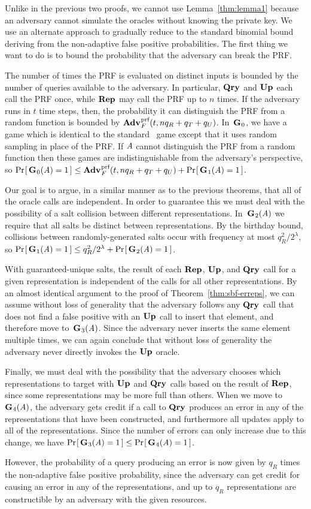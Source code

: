 Unlike in the previous two proofs, we cannot use Lemma~\ref{thm:lemma1} because an adversary cannot simulate the oracles without knowing the private key. We use an alternate approach to gradually reduce to the standard binomial bound deriving from the non-adaptive false positive probabilities. The first thing we want to do is to bound the probability that the adversary can break the PRF.

The number of times the PRF is evaluated on distinct inputs is bounded by the number of queries available to the adversary. In particular, $\textup{\textbf{Qry}}\hspace{0.5pt}$ and $\textup{\textbf{Up}}\hspace{0.5pt}$ each call the PRF once, while $\textup{\textbf{Rep}}\hspace{0.5pt}$ may call the PRF up to $n$ times. If the adversary runs in $t$ time steps, then, the probability it can distinguish the PRF from a random function is bounded by $\Adv{\prf}_F(t,nq_R+q_T+q_U)$. In~$\textup{\textbf{G}}\hspace{0.5pt}_0$, we have a game which is identical to the standard \errep\ game except that it uses random sampling in place of the PRF. If $\mathit{A}$ cannot distinguish the PRF from a random function then these games are indistinguishable from the adversary's perspective, so $\Prob{\game_0(\advA) = 1} \le \Adv{\prf}_F(t,nq_R+q_T+q_U) + \Prob{\game_1(\advA) = 1}$.

Our goal is to argue, in a similar manner as to the previous theorems, that all of the oracle calls are independent. In order to guarantee this we must deal with the possibility of a salt collision between different representations. In~$\textup{\textbf{G}}\hspace{0.5pt}_2(\mathit{A})$ we require that all salts be distinct between representations. By the birthday bound, collisions between randomly-generated salts occur with frequency at most $q_R^2/2^\lambda$, so $\Pr\hspace{-1pt}\left[\,\textup{\textbf{G}}\hspace{0.5pt}_1(\mathit{A}) = 1\,\right] \le q_R^2/2^\lambda + \Pr\hspace{-1pt}\left[\,\textup{\textbf{G}}\hspace{0.5pt}_2(\mathit{A}) = 1\,\right]$.

With guaranteed-unique salts, the result of each $\textup{\textbf{Rep}}\hspace{0.5pt}$, $\textup{\textbf{Up}}\hspace{0.5pt}$, and $\textup{\textbf{Qry}}\hspace{0.5pt}$ call for a given representation is independent of the calls for all other representations. By an almost identical argument to the proof of Theorem~\ref{thm:sbf-erreps}, we can assume without loss of generality that the adversary follows any $\textup{\textbf{Qry}}\hspace{0.5pt}$ call that does not find a false positive with an $\textup{\textbf{Up}}\hspace{0.5pt}$ call to insert that element, and therefore move to~$\textup{\textbf{G}}\hspace{0.5pt}_3(\mathit{A})$. Since the adversary never inserts the same element multiple times, we can again conclude that without loss of generality the adversary never directly invokes the $\textup{\textbf{Up}}\hspace{0.5pt}$ oracle.

Finally, we must deal with the possibility that the adversary chooses which representations to target with $\textup{\textbf{Up}}\hspace{0.5pt}$ and $\textup{\textbf{Qry}}\hspace{0.5pt}$ calls based on the result of $\textup{\textbf{Rep}}\hspace{0.5pt}$, since some representations may be more full than others. When we move to~$\textup{\textbf{G}}\hspace{0.5pt}_4(\mathit{A})$, the adversary gets credit if a call to $\textup{\textbf{Qry}}\hspace{0.5pt}$ produces an error in any of the representations that have been constructed, and furthermore all updates apply to all of the representations. Since the number of errors can only increase due to this change, we have $\Pr\hspace{-1pt}\left[\,\textup{\textbf{G}}\hspace{0.5pt}_3(\mathit{A}) = 1\,\right] \le \Pr\hspace{-1pt}\left[\,\textup{\textbf{G}}\hspace{0.5pt}_4(\mathit{A}) = 1\,\right]$.

%
However, the probability of a query producing an error is now given by $q_R$ times the non-adaptive false positive probability, since the adversary can get credit for causing an error in any of the representations, and up to $q_R$ representations are constructible by an adversary with the given resources.